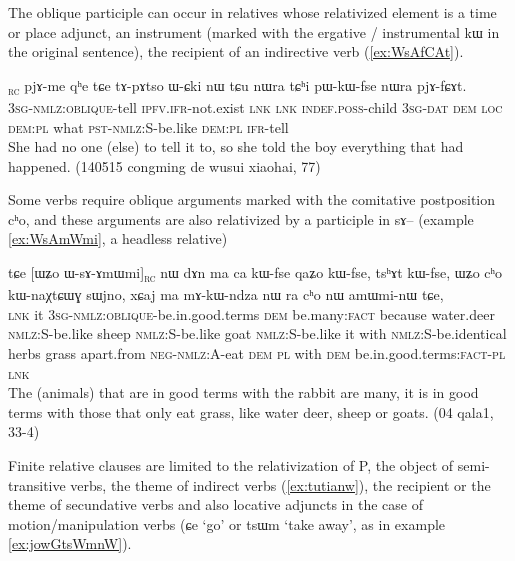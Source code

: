 \documentclass[oldfontcommands,oneside,a4paper,11pt]{article}
\newcommand{\ipa}[1]{{\phon#1}} %
\newcommand{\topic}{\textsc{dem}}
\newcommand{\rc}{\textsubscript{\textsc{rc}}}
\newcommand{\factual}[1]{\textsc{:fact}}
\begin{document}
The oblique participle can occur in relatives whose relativized element is a time or place adjunct, an instrument (marked with the ergative / instrumental \ipa{kɯ} in the original sentence),  the recipient of an indirective verb (\ref{ex:WsAfCAt}).

\begin{exe}
\ex \label{ex:WsAfCAt}
\gll
[\ipa{ɯ-sɤ-fɕɤt}]\rc{} 
\ipa{pjɤ-me} 	\ipa{qʰe} 	\ipa{tɕe} 	\ipa{tɤ-pɤtso} 	\ipa{ɯ-ɕki} 	\ipa{nɯ} 	\ipa{tɕu} 	\ipa{nɯra} 	\ipa{tɕʰi} 	\ipa{pɯ-kɯ-fse} 	\ipa{nɯra} 	\ipa{pjɤ-fɕɤt.} \\
\textsc{3sg-nmlz:oblique}-tell \textsc{ipfv.ifr}-not.exist \textsc{lnk} \textsc{lnk} \textsc{indef.poss}-child \textsc{3sg-dat} \textsc{dem} \textsc{loc} \textsc{dem:pl} what \textsc{pst-nmlz:S}-be.like  \textsc{dem:pl} \textsc{ifr}-tell \\
\glt She had no one (else) to tell it to, so she told the boy everything that had happened. (140515 congming de wusui xiaohai, 77)
\end{exe} 

Some verbs require oblique arguments marked with the comitative postposition \ipa{cʰo}, and these arguments are also relativized by a participle in \ipa{sɤ--} (example \ref{ex:WsAmWmi}, a headless relative)
     \begin{exe}
   \ex \label{ex:WsAmWmi}
 \gll 
\ipa{tɕe}   	[\ipa{ɯʑo}   	\ipa{ɯ-sɤ-ɤmɯmi}]\rc{}   	\ipa{nɯ}   	\ipa{dɤn}   	\ipa{ma}   	\ipa{ca}   	\ipa{kɯ-fse}   	\ipa{qaʑo}   	\ipa{kɯ-fse,}   	\ipa{tsʰɤt}   	\ipa{kɯ-fse,}   	 \ipa{ɯʑo}   	\ipa{cʰo}   	\ipa{kɯ-naχtɕɯɣ}   	\ipa{sɯjno,}   	\ipa{xɕaj}   	\ipa{ma}   	\ipa{mɤ-kɯ-ndza}   	\ipa{nɯ} \ipa{ra}   	\ipa{cʰo}   	\ipa{nɯ}   	\ipa{amɯmi-nɯ}   	\ipa{tɕe,}   \\
\textsc{lnk} it \textsc{3sg-nmlz:oblique}-be.in.good.terms \topic{}  be.many\factual{} because water.deer \textsc{nmlz:S}-be.like sheep \textsc{nmlz:S}-be.like goat  \textsc{nmlz:S}-be.like it with  \textsc{nmlz:S}-be.identical herbs grass apart.from \textsc{neg-nmlz:A}-eat \textsc{dem} \textsc{pl} with \textsc{dem}  be.in.good.terms\factual{}-\textsc{pl} \textsc{lnk} \\
\glt The (animals) that are in good terms with the rabbit are many, it is in good terms with those that only eat grass, like water deer, sheep or goats. (04 qala1, 33-4)
\end{exe}

 
Finite relative clauses are limited to the relativization of P, the object of semi-transitive verbs, the theme of indirect verbs (\ref{ex:tutianw}), the recipient or the theme of secundative verbs and also locative adjuncts in the case of motion/manipulation verbs (\ipa{ɕe} `go' or \ipa{tsɯm} `take away', as in example \ref{ex:jowGtsWmnW}).
\end{document}
